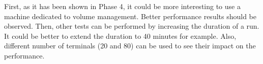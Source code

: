 First, as it has been shown in Phase 4, it could be more interesting to use a machine dedicated to volume management.
Better performance results should be observed.
Then, other tests can be performed by increasing the duration of a run. 
It could be better to extend the duration to 40 minutes for example.
Also, different number of terminals (20 and 80) can be used to see their impact on the performance.





